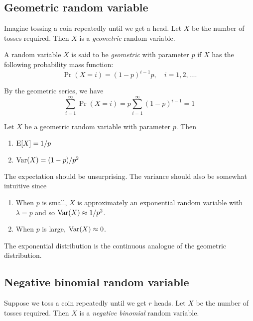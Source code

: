 \documentclass{article}
\begin{document}
\subsection{Geometric random variable}

Imagine tossing a coin repeatedly until we get a head.
Let $X$ be the number of tosses required.
Then $X$ is a \emph{geometric} random variable.

\begin{definition}
  A random variable $X$ is said to be \emph{geometric} with parameter $p$ if $X$ has the following probability mass function:
  \[
    \Pr(X = i) = (1 - p)^{i - 1} p, \quad i = 1, 2, \ldots.
  \]
\end{definition}

\begin{remark}
  By the geometric series, we have
  \[
    \sum\limits_{i = 1}^\infty \Pr(X = i) = p \sum\limits_{i = 1}^\infty (1 - p)^{i - 1} = 1
  \]
\end{remark}

\begin{proposition}
  Let $X$ be a geometric random variable with parameter $p$.
  Then
  \begin{enumerate}
    \item $\operatorname{E}[X] = 1/p$
    \item $\operatorname{Var}(X) = (1 - p)/p^2$
  \end{enumerate}
\end{proposition}
The expectation should be unsurprising.
The variance should also be somewhat intuitive since
\begin{enumerate}
  \item When $p$ is small, $X$ is approximately an exponential random variable with $\lambda = p$ and so $\operatorname{Var}(X) \approx 1/p^2$.
  \item When $p$ is large, $\operatorname{Var}(X) \approx 0$.
\end{enumerate}

\begin{remark}
  The exponential distribution is the continuous analogue of the geometric distribution.
\end{remark}

\subsection{Negative binomial random variable}

Suppose we toss a coin repeatedly until we get $r$ heads.
Let $X$ be the number of tosses required.
Then $X$ is a \emph{negative binomial} random variable.
\end{document}
